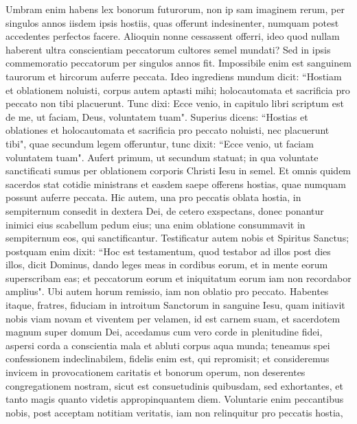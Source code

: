 \begin{biblechapter} 
\verse Umbram enim habens lex bonorum futurorum, non ip sam imaginem rerum, per singulos annos iisdem ipsis hostiis, quas offerunt indesinenter, numquam potest accedentes perfectos facere. 
\verse Alioquin nonne cessassent offerri, ideo quod nullam haberent ultra conscientiam peccatorum cultores semel mundati? 
\verse Sed in ipsis commemoratio peccatorum per singulos annos fit.  
\verse Impossibile enim est sanguinem taurorum et hircorum auferre peccata. 
\verse Ideo ingrediens mundum dicit: “Hostiam et oblationem noluisti, corpus autem aptasti mihi; 
\verse holocautomata et sacrificia pro peccato non tibi placuerunt. 
\verse Tunc dixi: Ecce venio, in capitulo libri scriptum est de me, ut faciam, Deus, voluntatem tuam". 
\verse Superius dicens: “Hostias et oblationes et holocautomata et sacrificia pro peccato noluisti, nec placuerunt tibi", quae secundum legem offeruntur, 
\verse tunc dixit: “Ecce venio, ut faciam voluntatem tuam". Aufert primum, ut secundum statuat; 
\verse in qua voluntate sanctificati sumus per oblationem corporis Christi Iesu in semel. 
\verse Et omnis quidem sacerdos stat cotidie ministrans et easdem saepe offerens hostias, quae numquam possunt auferre peccata. 
\verse Hic autem, una pro peccatis oblata hostia, in sempiternum consedit in dextera Dei, 
\verse de cetero exspectans, donec ponantur inimici eius scabellum pedum eius; 
\verse una enim oblatione consummavit in sempiternum eos, qui sanctificantur.  
\verse Testificatur autem nobis et Spiritus Sanctus; postquam enim dixit: 
\verse “Hoc est testamentum, quod testabor ad illos post dies illos, dicit Dominus, dando leges meas in cordibus eorum, et in mente eorum superscribam eas; 
\verse et peccatorum eorum et iniquitatum eorum iam non recordabor amplius". 
\verse Ubi autem horum remissio, iam non oblatio pro peccato. 
\verse Habentes itaque, fratres, fiduciam in introitum Sanctorum in sanguine Iesu, 
\verse quam initiavit nobis viam novam et viventem per velamen, id est carnem suam, 
\verse et sacerdotem magnum super domum Dei, 
\verse accedamus cum vero corde in plenitudine fidei, aspersi corda a conscientia mala et abluti corpus aqua munda; 
\verse teneamus spei confessionem indeclinabilem, fidelis enim est, qui repromisit; 
\verse et consideremus invicem in provocationem caritatis et bonorum operum, 
\verse non deserentes congregationem nostram, sicut est consuetudinis quibusdam, sed exhortantes, et tanto magis quanto videtis appropinquantem diem. 
\verse Voluntarie enim peccantibus nobis, post acceptam notitiam veritatis, iam non relinquitur pro peccatis hostia, 

\end{biblechapter}
